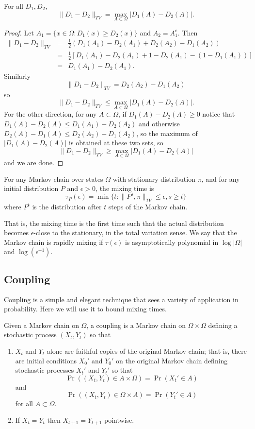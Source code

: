 \begin{lemma}
For all $D_1, D_2$,
\[\|D_1 - D_2\|_{TV} = \max_{A \subset \Omega} |D_1 (A) - D_2 (A)|.\]
\end{lemma}
\begin{proof}
Let $A_1 = \{x \in \Omega: D_1 (x) \geq D_2 (x) \}$ and $A_2 = A_1^c$. Then 
\begin{eqnarray*}
\| D_1 - D_2 \|_{TV} &=& \frac{1}{2} (D_1 (A_1) - D_2 (A_1) + D_2 (A_2) - D_1 (A_2)) \\
&=& \frac{1}{2} [ D_1 (A_1) - D_2 (A_1) + 1 - D_2 (A_1) - (1 - D_1(A_1))] \\
&=& D_1 (A_1) - D_2 (A_1).
\end{eqnarray*}
Similarly
\[\| D_1 - D_2 \|_{TV} = D_2 (A_2) - D_1 (A_2)\]
so
\[\|D_1 - D_2\|_{TV} \leq \max_{A \subset \Omega} |D_1 (A) - D_2 (A)|.\] 
For the other direction, for any $A \subset \Omega$, if $D_1 (A) - D_2 (A) \geq 0$ notice that $D_1 (A) - D_2 (A) \leq D_1 (A_1) - D_2 (A_2)$ and otherwise $D_2 (A) - D_1 (A) \leq D_2 (A_2) - D_1 (A_2)$, so the maximum of $|D_1 (A) - D_2 (A)|$ is obtained at these two sets, so 
\[\|D_1 - D_2\|_{TV} \geq \max_{A \subset \Omega} |D_1 (A) - D_2 (A)|\] 
and we are done.
\end{proof}

\begin{definition}
For any Markov chain over states $\Omega$ with stationary distribution $\pi$, and for any initial distribution $P$ and $\epsilon > 0$, the mixing time is
\[\tau_P(\epsilon) = \min \{t: \| P^s, \pi \|_{TV} \leq \epsilon, s \geq t \}\]
where $P^t$ is the distribution after $t$ steps of the Markov chain. 
\end{definition}

That is, the mixing time is the first time such that the actual distribution becomes $\epsilon$-close to the stationary, in the total variation sense. We say that the Markov chain is rapidly mixing if $\tau (\epsilon)$ is asymptotically polynomial in $\log |\Omega|$ and $\log (\epsilon^{-1})$.

\subsection{Coupling}
Coupling is a simple and elegant technique that sees a variety of application in probability. Here we will use it to bound mixing times.

\begin{definition}
Given a Markov chain on $\Omega$, a coupling is a Markov chain on $\Omega \times \Omega$ defining a stochastic process $(X_t, Y_t)$ so that
\begin{enumerate}
\item
$X_t$ and $Y_t$ alone are faithful copies of the original Markov chain; that is, there are initial conditions $X_0'$ and $Y_0'$ on the original Markov chain defining stochastic processes $X_t'$ and $Y_t'$ so that
\[\Pr ((X_t, Y_t) \in A \times \Omega) = \Pr (X_t' \in A)\]
and 
\[\Pr ((X_t, Y_t) \in \Omega \times A) = \Pr (Y_t' \in A)\]
for all $A \subset \Omega$.
\item
If $X_t = Y_t$ then $X_{t + 1} = Y_{t + 1}$ pointwise.
\end{enumerate}
\end{definition}

